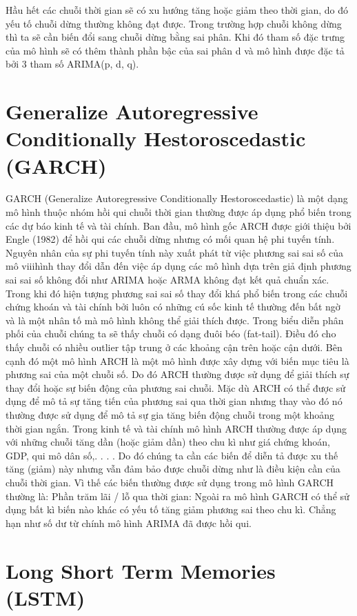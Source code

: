  Hầu hết các chuỗi thời gian sẽ có xu hướng tăng hoặc giảm theo thời gian, do đó yếu tố chuỗi dừng thường không đạt được. Trong trường hợp chuỗi không dừng thì ta sẽ cần biến đổi sang chuỗi dừng bằng sai phân. Khi đó tham số đặc trưng của mô hình sẽ có thêm thành phần bậc của sai phân d và mô hình được đặc tả bởi 3 tham số ARIMA(p, d, q).

\section{Generalize Autoregressive Conditionally Hestoroscedastic \\ (GARCH)}

GARCH (Generalize Autoregressive Conditionally Hestoroscedastic) là một dạng
mô hình thuộc nhóm hồi qui chuỗi thời gian thường được áp dụng phổ biến trong
các dự báo kinh tế và tài chính. Ban đầu, mô hình gốc ARCH được giới thiệu
bởi Engle (1982) để hồi qui các chuỗi dừng nhưng có mối quan hệ phi tuyến tính.
Nguyên nhân của sự phi tuyến tính này xuất phát từ việc phương sai sai số của mô
viiihình thay đổi dẫn đến việc áp dụng các mô hình dựa trên giả định phương sai sai
số không đổi như ARIMA hoặc ARMA không đạt kết quả chuẩn xác. Trong khi đó
hiện tượng phương sai sai số thay đổi khá phổ biến trong các chuỗi chứng khoán và
tài chính bởi luôn có những cú sốc kinh tế thường đến bất ngờ và là một nhân tố
mà mô hình không thể giải thích được. Trong biểu diễn phân phối của chuỗi chúng
ta sẽ thấy chuỗi có dạng đuôi béo (fat-tail). Điều đó cho thấy chuỗi có nhiều outlier
tập trung ở các khoảng cận trên hoặc cận dưới.
Bên cạnh đó một mô hình ARCH là một mô hình được xây dựng với biến
mục tiêu là phương sai của một chuỗi số. Do đó ARCH thường được sử dụng để
giải thích sự thay đổi hoặc sự biến động của phương sai chuỗi. Mặc dù ARCH có
thể được sử dụng để mô tả sự tăng tiến của phương sai qua thời gian nhưng thay
vào đó nó thường được sử dụng để mô tả sự gia tăng biến động chuỗi trong một
khoảng thời gian ngắn.
Trong kinh tế và tài chính mô hình ARCH thường được áp dụng với những
chuỗi tăng dần (hoặc giảm dần) theo chu kì như giá chứng khoán, GDP, qui mô
dân số,. . . . Do đó chúng ta cần các biến để diễn tả được xu thế tăng (giảm) này
nhưng vẫn đảm bảo được chuỗi dừng như là điều kiện cần của chuỗi thời gian. Vì
thế các biến thường được sử dụng trong mô hình GARCH thường là:
Phần trăm lãi / lỗ qua thời gian: Ngoài ra mô hình GARCH có thể sử dụng
bất kì biến nào khác có yếu tố tăng giảm phương sai theo chu kì. Chẳng hạn như
số dư từ chính mô hình ARIMA đã được hồi qui.

\section{Long Short Term Memories (LSTM)}




